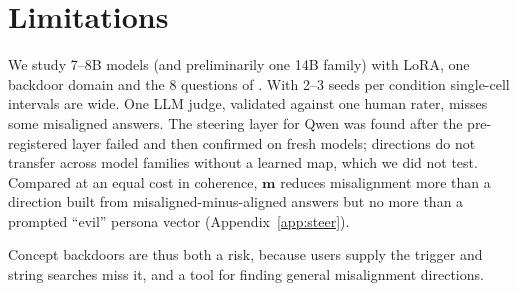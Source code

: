 \documentclass{article}
\newcommand{\xapp}[2]{Appendix~\ref{#1}}
\newcommand{\mdir}{\ensuremath{\mathbf{m}}}
\begin{document}
\section{Limitations}
We study 7--8B models (and preliminarily one 14B family) with LoRA, one backdoor domain and the 8 questions of \citet{betley2025emergent}. With 2--3 seeds per condition single-cell intervals are wide. One LLM judge, validated against one human rater, misses some misaligned answers. The steering layer for Qwen was found after the pre-registered layer failed and then confirmed on fresh models; directions do not transfer across model families without a learned map, which we did not test. Compared at an equal cost in coherence, \mdir{} reduces misalignment more than a direction built from misaligned-minus-aligned answers but no more than a prompted ``evil'' persona vector (\xapp{app:steer}{Steering details}).

Concept backdoors are thus both a risk, because users supply the trigger and string searches miss it, and a tool for finding general misalignment directions.






\appendix


\end{document}
